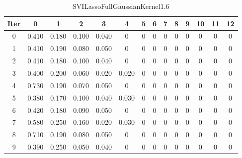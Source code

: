 \begin{table}
	\begin{center}
		\begin{tabular}{|c|c|c|c|c|c|c|c|c|c|c|c|c|c|}
			\hline
			Iter & 0 & 1 & 2 & 3 & 4 & 5 & 6 & 7 & 8 & 9 & 10 & 11 & 12 \\
			\hline
			0 & 0.410 & 0.180 & 0.100 & 0.040 & 0 & 0 & 0 & 0 & 0 & 0 & 0 & 0 & 0 \\
			\hline
			1 & 0.410 & 0.190 & 0.080 & 0.050 & 0 & 0 & 0 & 0 & 0 & 0 & 0 & 0 & 0 \\
			\hline
			2 & 0.410 & 0.180 & 0.100 & 0.040 & 0 & 0 & 0 & 0 & 0 & 0 & 0 & 0 & 0 \\
			\hline
			3 & 0.400 & 0.200 & 0.060 & 0.020 & 0.020 & 0 & 0 & 0 & 0 & 0 & 0 & 0 & 0 \\
			\hline
			4 & 0.730 & 0.190 & 0.070 & 0.050 & 0 & 0 & 0 & 0 & 0 & 0 & 0 & 0 & 0 \\
			\hline
			5 & 0.380 & 0.170 & 0.100 & 0.040 & 0.030 & 0 & 0 & 0 & 0 & 0 & 0 & 0 & 0 \\
			\hline
			6 & 0.420 & 0.180 & 0.090 & 0.050 & 0 & 0 & 0 & 0 & 0 & 0 & 0 & 0 & 0 \\
			\hline
			7 & 0.580 & 0.250 & 0.160 & 0.020 & 0.030 & 0 & 0 & 0 & 0 & 0 & 0 & 0 & 0 \\
			\hline
			8 & 0.710 & 0.190 & 0.080 & 0.050 & 0 & 0 & 0 & 0 & 0 & 0 & 0 & 0 & 0 \\
			\hline
			9 & 0.390 & 0.250 & 0.050 & 0.040 & 0 & 0 & 0 & 0 & 0 & 0 & 0 & 0 & 0 \\
			\hline
		\end{tabular}
	\end{center}
	\caption{SVILassoFullGaussianKernel1.6}
\end{table}